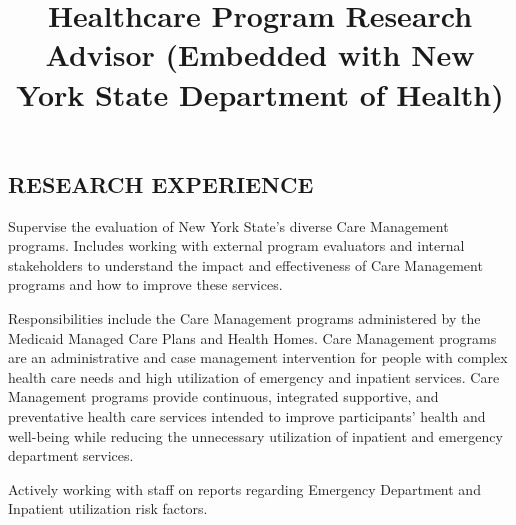 \documentclass[line, margin, 10pt]{res}
\begin{document}
\address{andy.choens@gmail.com  (518) 275 - 5984}
\address{(518) 275 - 5984}

\begin{resume}


  \section{RESEARCH EXPERIENCE}


  \title{Healthcare Program Research Advisor (Embedded with New York
    State Department of Health)}
  \begin{position}
    Supervise the evaluation of New York State's diverse Care
    Management programs. Includes working with external program
    evaluators and internal stakeholders to understand the impact and
    effectiveness of Care Management programs and how to improve these
    services.

    Responsibilities include the Care Management programs administered
    by the Medicaid Managed Care Plans and Health Homes. Care
    Management programs are an administrative and case management
    intervention for people with complex health care needs and high
    utilization of emergency and inpatient services. Care Management
    programs provide continuous, integrated supportive, and
    preventative health care services intended to improve
    participants' health and well-being while reducing the unnecessary
    utilization of inpatient and emergency department services.

    Actively working with staff on reports regarding
    Emergency Department and Inpatient utilization risk factors.


\end{position}
\end{resume}
\end{document}
